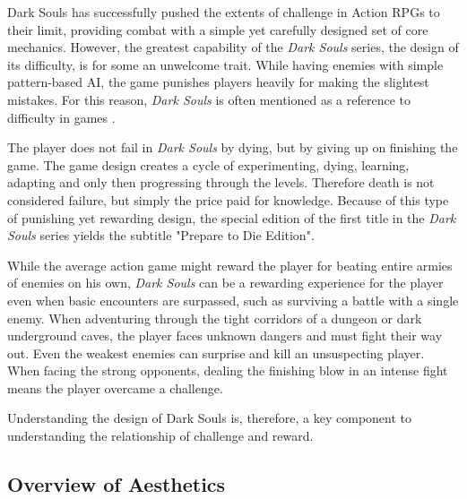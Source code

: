 Dark Souls has successfully pushed the extents of challenge in Action RPGs to their limit, providing combat with a simple yet carefully designed set of core mechanics. However, the greatest capability of the \emph{Dark Souls} series, the design of its difficulty, is for some an unwelcome trait. While having enemies with simple pattern-based AI, the game punishes players heavily for making the slightest mistakes. For this reason, \emph{Dark Souls} is often mentioned as a reference to difficulty in games \cite{URL_ExploringDesignOfDarkSouls}.

The player does not fail in \emph{Dark Souls} by dying, but by giving up on finishing the game. The game design creates a cycle of experimenting, dying, learning, adapting and only then progressing through the levels. Therefore death is not considered failure, but simply the price paid for knowledge. Because of this type of punishing yet rewarding design, the special edition of the first title in the \emph{Dark Souls} series yields the subtitle "Prepare to Die Edition".

While the average action game might reward the player for beating entire armies of enemies on his own, \emph{Dark Souls} can be a rewarding experience for the player even when basic encounters are surpassed, such as surviving a battle with a single enemy. When adventuring through the tight corridors of a dungeon or dark underground caves, the player faces unknown dangers and must fight their way out. Even the weakest enemies can surprise and kill an unsuspecting player. When facing the strong opponents, dealing the finishing blow in an intense fight means the player overcame a challenge.

Understanding the design of Dark Souls is, therefore, a key component to understanding the relationship of challenge and reward.


\subsection{Overview of Aesthetics}


